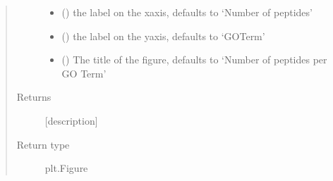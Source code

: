 \documentclass[letterpaper,10pt,english]{sphinxmanual}
\begin{document}
\begin{fulllineitems}
\begin{quote}
\begin{description}
\begin{itemize}
\item {} 
 (\sphinxstyleliteralemphasis{\sphinxupquote{, }}) \textendash{} the label on the x\sphinxhyphen{}axis, defaults to ‘Number of peptides’

\item {} 
 (\sphinxstyleliteralemphasis{\sphinxupquote{, }}) \textendash{} the label on the y\sphinxhyphen{}axis, defaults to ‘GO\sphinxhyphen{}Term’

\item {} 
 (\sphinxstyleliteralemphasis{\sphinxupquote{, }}) \textendash{} The title of the figure, defaults to ‘Number of peptides per GO Term’

\end{itemize}

\item[{Returns}] \leavevmode
{[}description{]}

\item[{Return type}] \leavevmode
plt.Figure

\end{description}\end{quote}

\end{fulllineitems}

\end{document}
